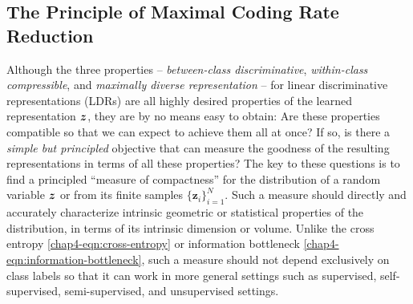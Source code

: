 \documentclass[../../book-main.tex]{subfiles}
\begin{document}
\subsection{The Principle of Maximal Coding Rate Reduction}\label{subsec:MCR2}





Although the three properties -- {\em between-class discriminative}, {\em within-class compressible}, and {\em maximally diverse representation} -- for linear discriminative representations (LDRs) are all highly desired properties  of the learned representation $\bm{z}$, they are by no means easy to obtain: Are these properties compatible so that we can expect to achieve them all at once? If so, is there a {\em simple but principled} objective that can measure the goodness of the resulting representations in terms of all these properties? The key to these questions {is to find} a principled ``measure of compactness'' for the distribution of a random variable $\bm{z}$ or from its finite samples $\{\bm z_i\}_{i=1}^N$. Such a measure should directly and accurately characterize intrinsic geometric or statistical properties of the distribution, in terms of its intrinsic dimension or {volume}. Unlike the cross entropy \eqref{chap4-eqn:cross-entropy} or information bottleneck \eqref{chap4-eqn:information-bottleneck}, such a measure should not depend exclusively on class labels so that it can work in more general settings such as supervised, self-supervised, semi-supervised, and unsupervised settings.
\end{document}
